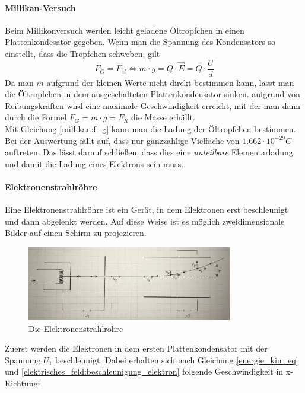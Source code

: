 \documentclass[a4paper]{article}
\begin{document}
				\paragraph{Millikan-Versuch}
					
					Beim Millikonversuch werden leicht geladene Öltropfchen in einen Plattenkondesator gegeben. Wenn man die Spannung des Kondensators so einstellt, dass die Tröpfchen schweben, gilt
					\begin{equation}\label{millikan:f_g}
						F_G=F_{el}\Leftrightarrow m\cdot g = Q\cdot \vec{E} = Q\cdot\frac{U}{d}
					\end{equation}
					Da man $m$ aufgrund der kleinen Werte nicht direkt bestimmen kann, lässt man die Öltropfchen in dem ausgeschalteten Plattenkondensator sinken. aufgrund von Reibungskräften wird eine maximale Geschwindigkeit erreicht, mit der man dann durch die Formel $F_G=m\cdot g =F_R$ die Masse erhällt.\\
					Mit Gleichung \ref{millikan:f_g} kann man die Ladung der Öltropfchen bestimmen. Bei der Auswertung fällt auf, dass nur ganzzahlige Vielfache von $1.662\cdot 10^{-29}C$ auftreten. Das lässt darauf schließen, dass dies eine \textit{unteilbare} Elementarladung und damit die Ladung eines Elektrons sein muss.
					
				\paragraph{Elektronenstrahlröhre}
					Eine Elektronenstrahlröhre ist ein Gerät, in dem Elektronen erst beschleunigt und dann abgelenkt werden. Auf diese Weise ist es möglich zweidimensionale Bilder auf einen Schirm zu projezieren.
					\begin{figure}[H]
						\centering
						\includegraphics[width=0.8\textwidth]{img/elektronenstrahlroehre.jpg}
						\caption{Die Elektronenstrahlröhre}
						\label{img:elektronenstrahlroehre}
					\end{figure}
					\noindent Zuerst werden die Elektronen in dem ersten Plattenkondensator mit der Spannung $U_1$ beschleunigt. Dabei erhalten sich nach Gleichung  \ref{energie_kin_eq} und \ref{elektrisches_feld:beschleunigung_elektron} folgende Geschwindigkeit in x-Richtung:
					
\end{document}
